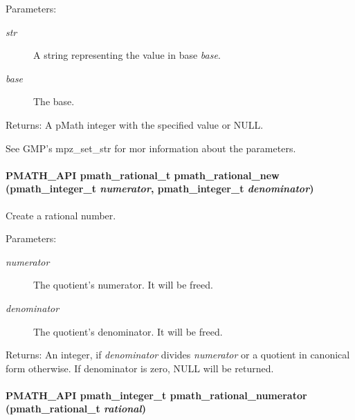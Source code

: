 \begin{Desc}
\item[Parameters:]
\begin{description}
\item[{\em str}]A string representing the value in base {\em base\/}. \item[{\em base}]The base. \end{description}
\end{Desc}
\begin{Desc}
\item[Returns:]A pMath integer with the specified value or NULL.\end{Desc}
See GMP's mpz\_\-set\_\-str for mor information about the parameters. \hypertarget{group__numbers_g142d493a889a7d94bafe79025b61d220}{
\paragraph[{pmath\_\-rational\_\-new}]{\setlength{\rightskip}{0pt plus 5cm}PMATH\_\-API {\bf pmath\_\-rational\_\-t} pmath\_\-rational\_\-new ({\bf pmath\_\-integer\_\-t} {\em numerator}, \/  {\bf pmath\_\-integer\_\-t} {\em denominator})}\hfill}
\label{group__numbers_g142d493a889a7d94bafe79025b61d220}


Create a rational number. 

\begin{Desc}
\item[Parameters:]
\begin{description}
\item[{\em numerator}]The quotient's numerator. It will be freed. \item[{\em denominator}]The quotient's denominator. It will be freed. \end{description}
\end{Desc}
\begin{Desc}
\item[Returns:]An integer, if {\em denominator\/} divides {\em numerator\/} or a quotient in canonical form otherwise. If denominator is zero, NULL will be returned. \end{Desc}
\hypertarget{group__numbers_gab6f926fcf84e9cf62c0d99699e491bf}{
\paragraph[{pmath\_\-rational\_\-numerator}]{\setlength{\rightskip}{0pt plus 5cm}PMATH\_\-API {\bf pmath\_\-integer\_\-t} pmath\_\-rational\_\-numerator ({\bf pmath\_\-rational\_\-t} {\em rational})}\hfill}
\label{group__numbers_gab6f926fcf84e9cf62c0d99699e491bf}


